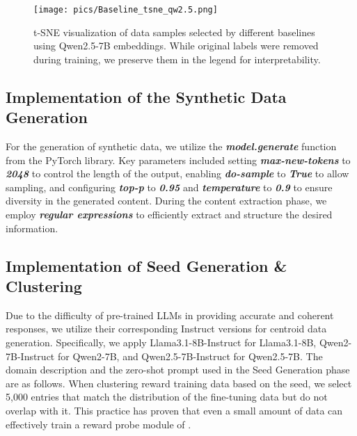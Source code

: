 \begin{figure}[t]
\centering
\texttt{[image: pics/Baseline\_tsne\_qw2.5.png]}
\vspace{-0.3cm}
\caption{t-SNE visualization of data samples selected by different baselines using Qwen2.5-7B embeddings. While original labels were removed during training, we preserve them in the legend for interpretability.}
\label{fig:baseline-tsne-qw2.5}
\end{figure}



\subsection{Implementation of the Synthetic Data Generation}
\label{sec:appendix-syn-data}

For the generation of synthetic data, we utilize the \textbf{\textit{model.generate}} function from the PyTorch library. Key parameters included setting \textbf{\textit{max-new-tokens}} to \textbf{\textit{2048}} to control the length of the output, enabling \textbf{\textit{do-sample}} to \textbf{\textit{True}} to allow sampling, and configuring \textbf{\textit{top-p}} to \textbf{\textit{0.95}} and \textbf{\textit{temperature}} to \textbf{\textit{0.9}} to ensure diversity in the generated content. During the content extraction phase, we employ \textbf{\textit{regular expressions}} to efficiently extract and structure the desired information.

\subsection{Implementation of Seed Generation \& Clustering}
\label{sec:appendix-domain-description}

Due to the difficulty of pre-trained LLMs in providing accurate and coherent responses, we utilize their corresponding Instruct versions for centroid data generation. Specifically, we apply Llama3.1-8B-Instruct for Llama3.1-8B, Qwen2-7B-Instruct for Qwen2-7B, and Qwen2.5-7B-Instruct for Qwen2.5-7B. The domain description and the zero-shot prompt used in the Seed Generation phase are as follows. When clustering reward training data based on the seed, we select 5,000 entries that match the distribution of the fine-tuning data but do not overlap with it. This practice has proven that even a small amount of data can effectively train a reward probe module of \ours.

